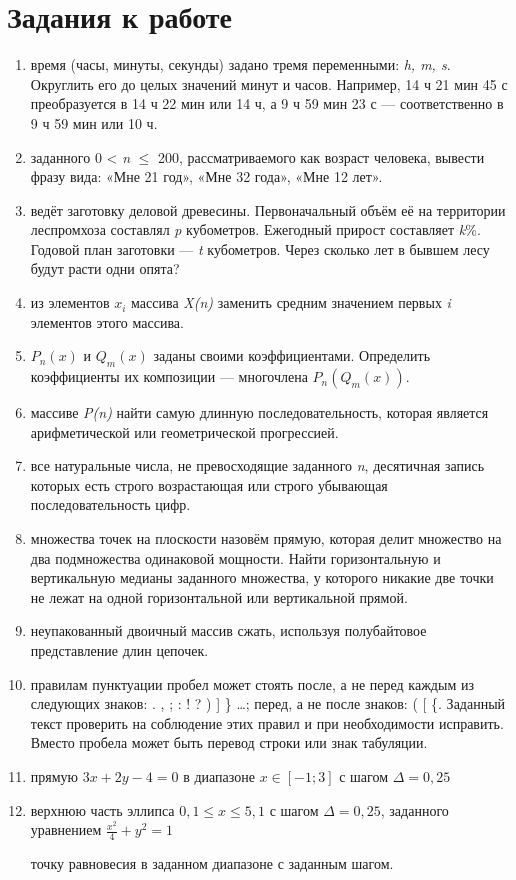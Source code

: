 \chapter{Задания к работе}

\begin{center}\end{center}

\begin{enumerate}
	\item{} время (часы, минуты, секунды) задано тремя переменными: \textit{h, m, s}. Округлить его до целых значений минут и часов. Например, 14 ч 21 мин 45 с преобразуется в 14 ч 22 мин или 14 ч, а 9 ч 59 мин 23 с — соответственно в 9 ч 59 мин или 10 ч.
    \item{} заданного 0 < \textit{n} $\leq$ 200, рассматриваемого как возраст человека, вывести фразу вида: «Мне 21 год», «Мне 32 года», «Мне 12 лет».
    \item{} ведёт заготовку деловой древесины. Первоначальный объём её на территории леспромхоза составлял \textit{p} кубометров. Ежегодный прирост составляет \textit{k}\%. Годовой план заготовки — \textit{t} кубометров. Через сколько лет в бывшем лесу будут расти одни опята?
    \item{} из элементов $x_i$ массива \textit{X(n)} заменить средним значением первых \textit{i} элементов этого массива.
    \item{} $P_n(x)$ и $Q_m(x)$ заданы своими коэффициентами. Определить коэффициенты их композиции — многочлена $P_n(Q_m(x))$.
    \item{} массиве \textit{P(n)} найти самую длинную последовательность, которая является арифметической или геометрической прогрессией.
    \item{} все натуральные числа, не превосходящие заданного \textit{n}, десятичная запись которых есть строго возрастающая или строго убывающая последовательность цифр.
    \item{} множества точек на плоскости назовём прямую, которая делит множество на два подмножества одинаковой мощности. Найти горизонтальную и вертикальную медианы заданного множества, у которого никакие две точки не лежат на одной горизонтальной или вертикальной прямой.
    \item{} неупакованный двоичный массив сжать, используя полубайтовое представление длин цепочек.
    \item{} правилам пунктуации пробел может стоять после, а не перед каждым из следующих знаков: . , ; : ! ? ) ] \} …; перед, а не после знаков: ( [ \{. Заданный текст проверить на соблюдение этих правил и при необходимости исправить. Вместо пробела может быть перевод строки или знак табуляции.
    \item{} прямую $3x + 2y - 4 = 0$ в диапазоне $x \in [-1;3]$ с шагом $\Delta = 0,25$
    \item{} верхнюю часть эллипса $0,1 \leq x \leq 5,1$ с шагом $\Delta = 0,25$, заданного уравнением $\frac{x^2}{4} + y^2 = 1$
    \begin{item}
		 точку равновесия в заданном диапазоне с заданным шагом.


\end{item}
\end{enumerate}
